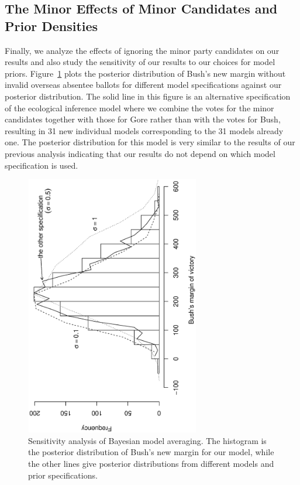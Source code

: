 \documentclass[11pt,titlepage]{article}
\begin{document}
\subsection{The Minor Effects of Minor Candidates and Prior Densities}

Finally, we analyze the effects of ignoring the minor party candidates
on our results and also study the sensitivity of our results to our
choices for model priors.  Figure~\ref{fg:sensitivity} plots the
posterior distribution of Bush's new margin without invalid overseas
absentee ballots for different model specifications against our
posterior distribution.  The solid line in this figure is an
alternative specification of the ecological inference model where we
combine the votes for the minor candidates together with those for
Gore rather than with the votes for Bush, resulting in 31 new
individual models corresponding to the 31 models already one.  The
posterior distribution for this model is very similar to the results
of our previous analysis indicating that our results do not depend on
which model specification is used.
\begin{figure}[t]
\begin{center}
\includegraphics[width=3in,height=4.5in,angle=-90]{sensitivity}
\caption{Sensitivity analysis of Bayesian model
  averaging. The histogram is the posterior distribution of Bush's new
  margin for our model, while the other lines give posterior
  distributions from different models and prior specifications.}
\label{fg:sensitivity}
\end{center} 
\end{figure}
\end{document}
